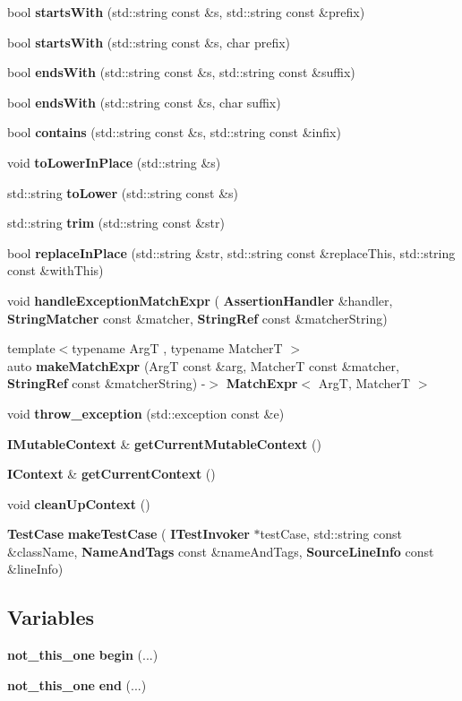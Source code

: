 \begin{DoxyCompactItemize}
bool \textbf{ starts\+With} (std\+::string const \&s, std\+::string const \&prefix)
\item 
bool \textbf{ starts\+With} (std\+::string const \&s, char prefix)
\item 
bool \textbf{ ends\+With} (std\+::string const \&s, std\+::string const \&suffix)
\item 
bool \textbf{ ends\+With} (std\+::string const \&s, char suffix)
\item 
bool \textbf{ contains} (std\+::string const \&s, std\+::string const \&infix)
\item 
void \textbf{ to\+Lower\+In\+Place} (std\+::string \&s)
\item 
std\+::string \textbf{ to\+Lower} (std\+::string const \&s)
\item 
std\+::string \textbf{ trim} (std\+::string const \&str)
\item 
bool \textbf{ replace\+In\+Place} (std\+::string \&str, std\+::string const \&replace\+This, std\+::string const \&with\+This)
\item 
void \textbf{ handle\+Exception\+Match\+Expr} (\textbf{ Assertion\+Handler} \&handler, \textbf{ String\+Matcher} const \&matcher, \textbf{ String\+Ref} const \&matcher\+String)
\item 
{\footnotesize template$<$typename ArgT , typename MatcherT $>$ }\\auto \textbf{ make\+Match\+Expr} (ArgT const \&arg, MatcherT const \&matcher, \textbf{ String\+Ref} const \&matcher\+String) -\/$>$ \textbf{ Match\+Expr}$<$ ArgT, MatcherT $>$
\item 
void \textbf{ throw\+\_\+exception} (std\+::exception const \&e)
\item 
\textbf{ I\+Mutable\+Context} \& \textbf{ get\+Current\+Mutable\+Context} ()
\item 
\textbf{ I\+Context} \& \textbf{ get\+Current\+Context} ()
\item 
void \textbf{ clean\+Up\+Context} ()
\item 
\textbf{ Test\+Case} \textbf{ make\+Test\+Case} (\textbf{ I\+Test\+Invoker} $\ast$test\+Case, std\+::string const \&class\+Name, \textbf{ Name\+And\+Tags} const \&name\+And\+Tags, \textbf{ Source\+Line\+Info} const \&line\+Info)
\end{DoxyCompactItemize}
\subsection*{Variables}
\begin{DoxyCompactItemize}
\item 
\textbf{ not\+\_\+this\+\_\+one} \textbf{ begin} (...)
\item 
\textbf{ not\+\_\+this\+\_\+one} \textbf{ end} (...)
\end{DoxyCompactItemize}


